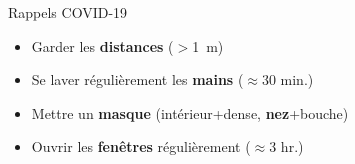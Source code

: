 \documentclass[french,c,%
hyperref={%
    pdftitle={Rappels COVID-19},%
    pdfauthor={Guillaume MULLER},%
    pdfsubject={COVID-19},%
    pdfkeywords={COVID-19}%
    colorlinks=true,%
    urlcolor=blue,%
    linkcolor=%
      },%
xcolor={pdftex,svgnames}, %
]{beamer}  %
\begin{document}
\begin{frame}{Rappels COVID-19}
  \begin{itemize}
    \item[]  \hspace{.8cm}
      Garder les \textbf{distances} { \scriptsize ($>$1~m) }
    \item[]  \hspace{.8cm}
      Se laver régulièrement les \textbf{mains} { \scriptsize ($\approx$30 min.) }
    \item[]  \hspace{.8cm}
      Mettre un \textbf{masque} { \scriptsize (intérieur+dense, \textbf{nez}+bouche) }
    \item[]  \hspace{.8cm}
      Ouvrir les \textbf{fenêtres} régulièrement { \scriptsize ($\approx$3 hr.)}
  \end{itemize}
\end{frame}
\end{document}
